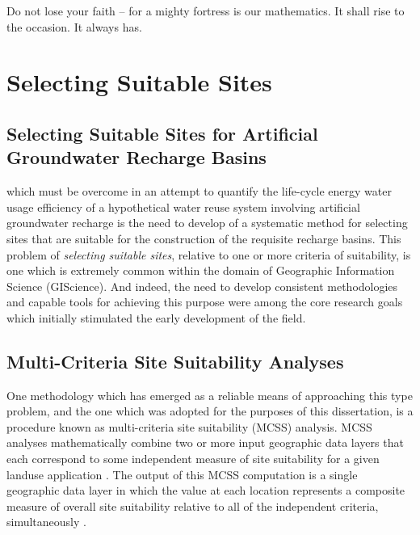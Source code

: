 \begin{savequote}[75mm]
Do not lose your faith -- for a mighty fortress is our mathematics. It shall rise to the occasion. It always has. 
\end{savequote}

\chapter{Selecting Suitable Sites}
\label{chapter 1}

\newpage
 
\section{Selecting Suitable Sites for Artificial Groundwater Recharge Basins}

 which must be overcome in an attempt to quantify the life-cycle energy water usage efficiency of a hypothetical water reuse system involving artificial groundwater recharge is the need to develop of a systematic method for selecting sites that are suitable for the construction of the requisite recharge basins. This problem of \textit{selecting suitable sites}, relative to one or more criteria of suitability, is one which is extremely common within the domain of Geographic Information Science (GIScience). And indeed, the need to develop consistent methodologies and capable tools for achieving this purpose were among the core research goals which initially stimulated the early development of the field.
 
\section{Multi-Criteria Site Suitability Analyses}

One methodology which has emerged as a reliable means of approaching this type problem, and the one which was adopted for the purposes of this dissertation, is a procedure known as multi-criteria site suitability (MCSS) analysis. MCSS analyses mathematically combine two or more input geographic data layers that each correspond to some independent measure of site suitability for a given landuse application \cite{Bolstad2005}. The output of this MCSS computation is a single geographic data layer in which the value at each location represents a composite measure of overall site suitability relative to all of the independent criteria, simultaneously \cite{Hopkins1977, Collins2001}.  

